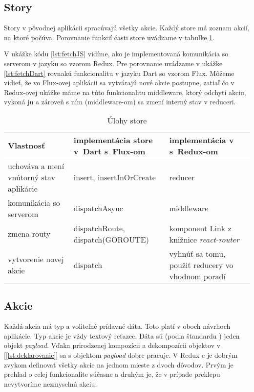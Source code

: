 \subsection{Story}
Story v pôvodnej aplikácii spracúvajú všetky akcie. Každý store má zoznam akcií, na ktoré počúva. Porovnanie funkcií časti store uvádzame v tabuľke \ref{table:store}.

V ukážke kódu \ref{lst:fetchJS} vidíme, ako je implementovaná komunikácia so serverom v jazyku \JS{} so vzorom Redux. Pre porovnanie uvádzame v ukážke \ref{lst:fetchDart} rovnakú funkcionalitu v jazyku Dart so vzorom Flux. Môžeme vidieť, že vo Flux-ovej aplikácii sa vytvárajú nové akcie postupne, zatiaľ čo v Redux-ovej ukážke máme na túto funkcionalitu middleware, ktorý odchytí akciu, vykoná ju a zároveň s ním (middleware-om) sa zmení interný stav v reduceri.

\begin{table}
  \caption{Úlohy store}
  \label{table:store}
  \begin{tabular}{| p{4cm} | p{5cm} | p{5cm} |}
   \hline         %
     Vlastnosť & implementácia store v~Dart s~Flux-om & implementácia v~\JS{} s~Redux-om \\
    \hline
    \hline
     uchováva a mení vnútorný stav aplikácie & 
     insert, insertInOrCreate &
     reducer \\
    \hline
     komunikácia so serverom & 
     dispatchAsync & 
     middleware \\
    \hline
     zmena routy & 
     dispatchRoute, dispatch(GOROUTE) & 
     komponent Link z knižnice \emph{react-router} \\
    \hline
     vytvorenie novej akcie & 
     dispatch & 
     vyhnúť sa tomu, použiť reducery vo vhodnom poradí \\%
    \hline
   \end{tabular}
\end{table}



\subsection{Akcie}
Každá akcia má typ a voliteľné prídavné dáta. %
Toto platí v oboch návrhoch aplikácie. Typ akcie je vždy textový reťazec. Dáta sú (podľa štandardu \cite{fluxStAction}) jeden objekt \emph{payload}. 
Vďaka prirodzenej kompozícii a dekompozícii objektov v \JS{} [\ref{lst:deklarovanie}] sa s objektom \emph{payload} dobre pracuje. 
V Redux-e je dobrým zvykom definovať všetky akcie na jednom mieste z dvoch dôvodov. Prvým je prehľad o celej funkcionalite súčasne a druhým je, že v prípade preklepu nevytvoríme nezmyselnú akciu.

